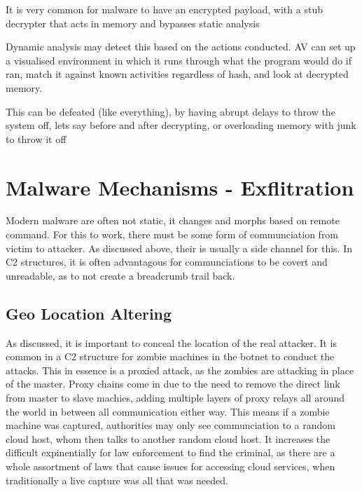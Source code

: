 It is very common for malware to have an encrypted payload, with a stub decrypter that acts in memory and bypasses static analysis

Dynamic analysis may detect this based on the actions conducted. AV can set up a visualised environment in which it runs through what the program would do if ran, match it against 
known activities regardless of hash, and look at decrypted memory.

This can be defeated (like everything), by having abrupt delays to throw the system off, lets say before and after decrypting, or overloading memory with junk to throw it off


\chapter{Malware Mechanisms - Exflitration}
Modern malware are often not static, it changes and morphs based on remote command. For this to work, there must be some form of communciation from victim to attacker. As discussed above, their is usually a side channel for this.
In C2 structures, it is often advantagous for communciations to be covert and unreadable, as to not create a breadcrumb trail back. 

\section{Geo Location Altering}
As discussed, it is important to conceal the location of the real attacker. It is common in a C2 structure for zombie machines in the botnet to conduct the attacks. This in essence is a proxied attack,
as the zombies are attacking in place of the master. Proxy chains come in due to the need to remove the direct link from master to slave machies, adding multiple layers of proxy relays all around the world 
in between all communication either way. This means if a zombie machine was captured, authorities may only see communciation to a random cloud host, whom then talks to another random cloud host. It increases the
difficult expinentially for law enforcement to find the criminal, as there are a whole assortment of laws that cause issues for accessing cloud services, when traditionally a live capture was all that was needed. 


